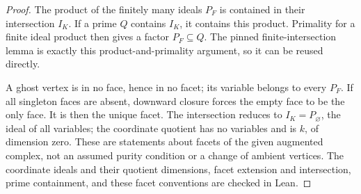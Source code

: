 \begin{proof}
The product of the finitely many ideals $P_F$ is contained in their
intersection $I_K$. If a prime $Q$ contains $I_K$, it contains this product.
Primality for a finite ideal product then gives a factor $P_F\subseteq Q$.
The pinned finite-intersection lemma is exactly this product-and-primality
argument, so it can be reused directly.

A ghost vertex is in no face, hence in no facet; its variable belongs to
every $P_F$. If all singleton faces are absent, downward closure forces
the empty face to be the only face. It is then the unique facet. The
intersection reduces to $I_K=P_{\varnothing}$, the ideal of all variables;
the coordinate quotient has no variables and is $k$, of dimension zero.
These are statements about facets of the given augmented complex, not an
assumed purity condition or a change of ambient vertices. The coordinate
ideals and their quotient dimensions, facet extension and intersection,
prime containment, and these facet conventions are checked in Lean.
\end{proof}

